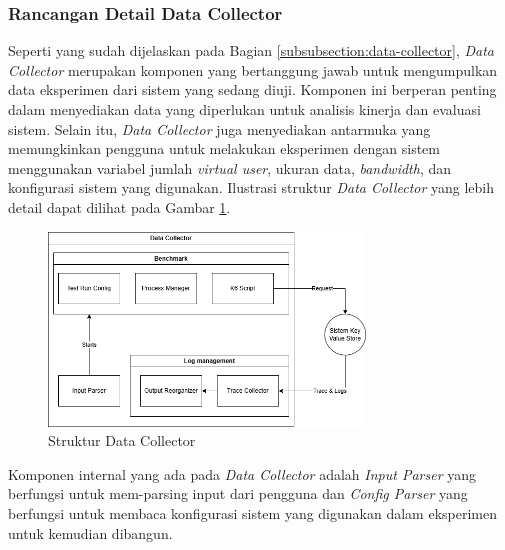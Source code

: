 \subsubsection{Rancangan Detail Data Collector}
\label{subsubsection:detail-data-collector}

Seperti yang sudah dijelaskan pada Bagian \ref{subsubsection:data-collector}, \textit{Data Collector} merupakan komponen yang bertanggung jawab untuk mengumpulkan data eksperimen dari sistem yang sedang diuji. Komponen ini berperan penting dalam menyediakan data yang diperlukan untuk analisis kinerja dan evaluasi sistem. Selain itu, \textit{Data Collector} juga menyediakan antarmuka yang memungkinkan pengguna untuk melakukan eksperimen dengan sistem menggunakan variabel jumlah \textit{virtual user}, ukuran data, \textit{bandwidth}, dan konfigurasi sistem yang digunakan. Ilustrasi struktur \textit{Data Collector} yang lebih detail dapat dilihat pada Gambar \ref{fig:data-collector-structure}.

\begin{figure}[ht]
	\centering
	\includegraphics[width=0.75\textwidth]{resources/chapter-3/data-collector-architecture.png}
	\caption{Struktur Data Collector}
	\label{fig:data-collector-structure}
\end{figure}

Komponen internal yang ada pada \textit{Data Collector} adalah \textit{Input Parser} yang berfungsi untuk mem-parsing input dari pengguna dan \textit{Config Parser} yang berfungsi untuk membaca konfigurasi sistem yang digunakan dalam eksperimen untuk kemudian dibangun.